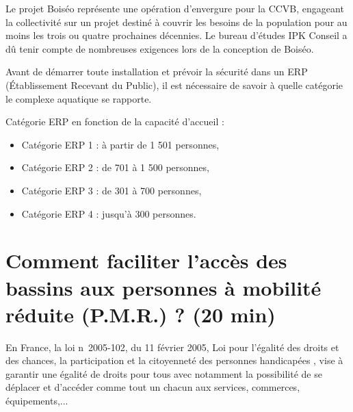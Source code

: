 

\vspace{0.5cm}

Le projet Boiséo représente une opération d'envergure pour la CCVB, engageant la collectivité sur un projet destiné à couvrir les besoins de la population pour au moins les trois ou quatre prochaines décennies. Le bureau d'études IPK Conseil a dû tenir compte de nombreuses exigences lors de la conception de Boiséo.

Avant de démarrer toute installation et prévoir la sécurité dans un ERP (Établissement Recevant du Public), il est nécessaire de savoir à quelle catégorie le complexe aquatique se rapporte.

\newpage

Catégorie ERP en fonction de la capacité d'accueil :
\begin{itemize}
 \item Catégorie ERP 1 : à partir de 1 501 personnes,
 \item Catégorie ERP 2 : de 701 à 1 500 personnes,
 \item Catégorie ERP 3 : de 301 à 700 personnes,
 \item Catégorie ERP 4 : jusqu'à 300 personnes.
\end{itemize}




\section{Comment faciliter l'accès des bassins aux personnes à mobilité réduite (P.M.R.) ? (20 min)}

En France, la loi n\textdegree\ 2005-102, du 11 février 2005, \og Loi pour l'égalité des droits et des chances, la participation et la citoyenneté des personnes handicapées \fg, vise à garantir une égalité de droits pour tous avec notamment la possibilité de se déplacer et d'accéder comme
tout un chacun aux services, commerces, équipements,...


